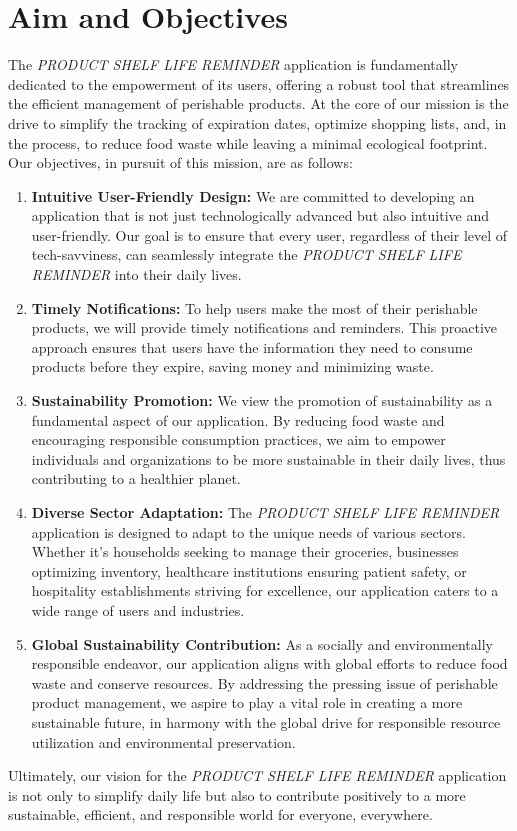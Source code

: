 \section{Aim and Objectives}
The \textit{PRODUCT SHELF LIFE REMINDER} application is fundamentally dedicated to the empowerment of its users, offering a robust tool that streamlines the efficient management of perishable products. At the core of our mission is the drive to simplify the tracking of expiration dates, optimize shopping lists, and, in the process, to reduce food waste while leaving a minimal ecological footprint. Our objectives, in pursuit of this mission, are as follows:
\begin{enumerate}
    \item \textbf{Intuitive User-Friendly Design:} We are committed to developing an application that is not just technologically advanced but also intuitive and user-friendly. Our goal is to ensure that every user, regardless of their level of tech-savviness, can seamlessly integrate the \textit{PRODUCT SHELF LIFE REMINDER} into their daily lives.
    \item \textbf{Timely Notifications:} To help users make the most of their perishable products, we will provide timely notifications and reminders. This proactive approach ensures that users have the information they need to consume products before they expire, saving money and minimizing waste.
    \item \textbf{Sustainability Promotion:} We view the promotion of sustainability as a fundamental aspect of our application. By reducing food waste and encouraging responsible consumption practices, we aim to empower individuals and organizations to be more sustainable in their daily lives, thus contributing to a healthier planet.
    \item \textbf{Diverse Sector Adaptation:} The \textit{PRODUCT SHELF LIFE REMINDER} application is designed to adapt to the unique needs of various sectors. Whether it's households seeking to manage their groceries, businesses optimizing inventory, healthcare institutions ensuring patient safety, or hospitality establishments striving for excellence, our application caters to a wide range of users and industries.    
    \item \textbf{Global Sustainability Contribution:} As a socially and environmentally responsible endeavor, our application aligns with global efforts to reduce food waste and conserve resources. By addressing the pressing issue of perishable product management, we aspire to play a vital role in creating a more sustainable future, in harmony with the global drive for responsible resource utilization and environmental preservation.
\end{enumerate}
Ultimately, our vision for the \textit{PRODUCT SHELF LIFE REMINDER} application is not only to simplify daily life but also to contribute positively to a more sustainable, efficient, and responsible world for everyone, everywhere.

